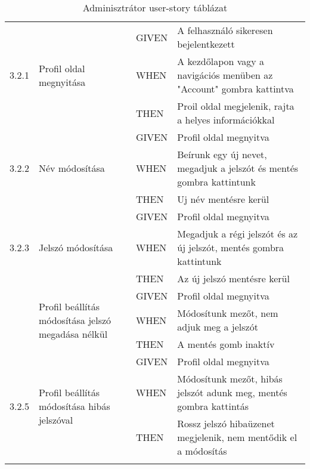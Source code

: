 \begin{center}
\begin{longtable}{ | p{} | p{} | p{} | p{} | }
			\multirow{3}{*}{3.2.1} 
			& \multirow{3}{=}{Profil oldal megnyitása} 
			& GIVEN 
			& A felhasználó sikeresen bejelentkezett \\
			\cline{3-4}
			& & WHEN 
			& A kezdőlapon vagy a navigációs menüben az "Account" gombra kattintva \\
			\cline{3-4}
			& & THEN 
			& Proil oldal megjelenik, rajta a helyes információkkal \\
			\hline

			\multirow{3}{*}{3.2.2} 
			& \multirow{3}{=}{Név módosítása} 
			& GIVEN 
			& Profil oldal megnyitva \\
			\cline{3-4}
			& & WHEN 
			& Beírunk egy új nevet, megadjuk a jelszót és mentés gombra kattintunk \\
			\cline{3-4}
			& & THEN 
			& Uj név mentésre kerül \\
			\hline

			\multirow{3}{*}{3.2.3} 
			& \multirow{3}{=}{Jelszó módosítása} 
			& GIVEN 
			& Profil oldal megnyitva \\
			\cline{3-4}
			& & WHEN 
			& Megadjuk a régi jelszót és az új jelszót, mentés gombra kattintunk \\
			\cline{3-4}
			& & THEN 
			& Az új jelszó mentésre kerül \\
			\hline

			\pagebreak

			\multirow{3}{*}{3.2.4} 
			& \multirow{3}{=}{Profil beállítás módosítása jelszó megadása nélkül} 
			& GIVEN 
			& Profil oldal megnyitva
			 \\
			\cline{3-4}
			& & WHEN 
			& Módosítunk mezőt, nem adjuk meg a jelszót 
			\\
			\cline{3-4}
			& & THEN 
			& A mentés gomb inaktív

			 \\
			\hline

			\multirow{3}{*}{3.2.5} 
			& \multirow{3}{=}{Profil beállítás módosítása hibás jelszóval} 
			& GIVEN 
			& Profil oldal megnyitva \\
			\cline{3-4}
			& & WHEN 
			& Módosítunk mezőt, hibás jelszót adunk meg, mentés gombra kattintás \\
			\cline{3-4}
			& & THEN 
			& Rossz jelszó hibaüzenet megjelenik, nem mentődik el a módosítás \\
			\hline

			\caption{Adminisztrátor user-story táblázat}
			\label{tab:userstoryadmin}       
	\end{longtable}
\end{center}

